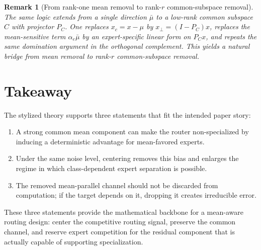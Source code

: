 \documentclass[11pt]{article}
\newtheorem{remark}{Remark}
\begin{document}
\begin{remark}[From rank-one mean removal to rank-$r$ common-subspace removal]
The same logic extends from a single direction $\bar\mu$ to a low-rank common subspace $C$ with projector $P_C$. One replaces $x_c=x-\mu$ by $x_\perp=(I-P_C)x$, replaces the mean-sensitive term $\alpha_e\bar\mu$ by an expert-specific linear form on $P_Cx$, and repeats the same domination argument in the orthogonal complement. This yields a natural bridge from mean removal to rank-$r$ common-subspace removal.
\end{remark}

\section{Takeaway}

The stylized theory supports three statements that fit the intended paper story:
\begin{enumerate}
    \item A strong common mean component can make the router non-specialized by inducing a deterministic advantage for mean-favored experts.
    \item Under the same noise level, centering removes this bias and enlarges the regime in which class-dependent expert separation is possible.
    \item The removed mean-parallel channel should not be discarded from computation; if the target depends on it, dropping it creates irreducible error.
\end{enumerate}

These three statements provide the mathematical backbone for a mean-aware routing design: center the competitive routing signal, preserve the common channel, and reserve expert competition for the residual component that is actually capable of supporting specialization.
\end{document}
